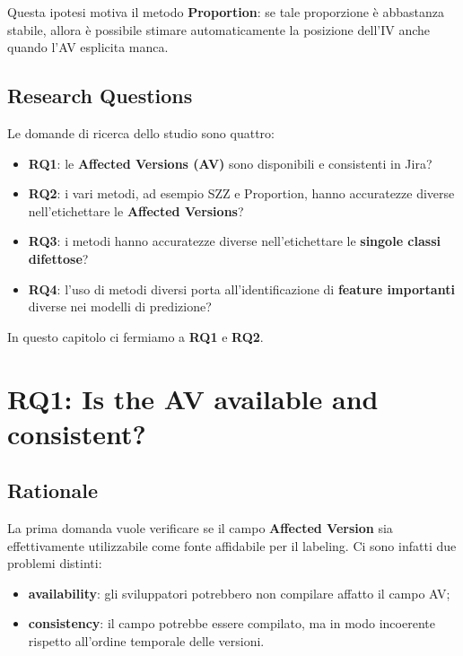 Questa ipotesi motiva il metodo \textbf{Proportion}: se tale proporzione è abbastanza stabile, allora è possibile stimare automaticamente la posizione dell'IV anche quando l'AV esplicita manca.

\subsection{Research Questions}

Le domande di ricerca dello studio sono quattro:

\begin{itemize}
    \item \textbf{RQ1}: le \textbf{Affected Versions (AV)} sono disponibili e consistenti in Jira?
    \item \textbf{RQ2}: i vari metodi, ad esempio SZZ e Proportion, hanno accuratezze diverse nell'etichettare le \textbf{Affected Versions}?
    \item \textbf{RQ3}: i metodi hanno accuratezze diverse nell'etichettare le \textbf{singole classi difettose}?
    \item \textbf{RQ4}: l'uso di metodi diversi porta all'identificazione di \textbf{feature importanti} diverse nei modelli di predizione?
\end{itemize}

In questo capitolo ci fermiamo a \textbf{RQ1} e \textbf{RQ2}.

\section{RQ1: Is the AV available and consistent?}

\subsection{Rationale}

La prima domanda vuole verificare se il campo \textbf{Affected Version} sia effettivamente utilizzabile come fonte affidabile per il labeling. Ci sono infatti due problemi distinti:

\begin{itemize}
    \item \textbf{availability}: gli sviluppatori potrebbero non compilare affatto il campo AV;
    \item \textbf{consistency}: il campo potrebbe essere compilato, ma in modo incoerente rispetto all'ordine temporale delle versioni.
\end{itemize}

